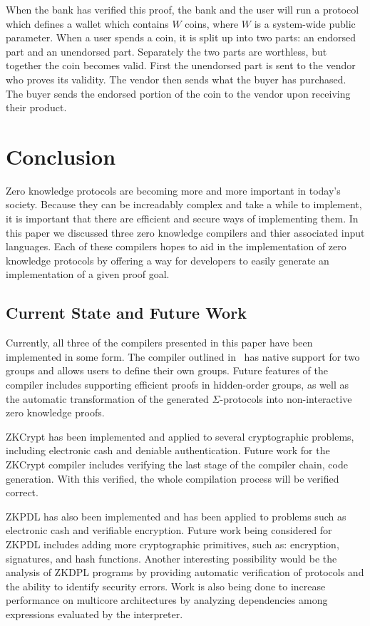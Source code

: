 \documentclass{sig-alternate}
\begin{document}
	When the bank has verified this proof, the bank and the user will run a protocol
	which defines a wallet which contains $W$ coins, where $W$ is a system-wide
	public parameter. When a user spends a coin, it is split up into two parts: an
	endorsed part and an unendorsed part. Separately the two parts are worthless, but
	together the coin becomes valid. First the unendorsed part is sent to the vendor
	who proves its validity. The vendor then sends what the buyer has purchased. The
	buyer sends the endorsed portion of the coin to the vendor upon receiving their
	product.

\section{Conclusion}
	Zero knowledge protocols are becoming more and more important in today's society. 
	Because they can be increadably complex and take a while to implement, it is important 
	that there are efficient and secure ways of implementing them. In this paper we discussed
	three zero knowledge compilers and thier associated input languages. Each of these compilers
	hopes to aid in the implementation of zero knowledge protocols by offering a way for
	developers to easily generate an implementation of a given proof goal.
	
	\subsection{Current State and Future Work}
	Currently, all three of the compilers presented in this paper have
	been implemented in some form. The compiler outlined in~\cite{Sigma:2009}
	has native support for two groups and allows users to define their own
	groups. Future features of the compiler includes supporting efficient
	proofs in hidden-order groups, as well as the automatic transformation
	of the generated $\Sigma$-protocols into non-interactive zero knowledge
	proofs.
	
	ZKCrypt has been implemented and applied to several cryptographic
	problems, including electronic cash and deniable authentication.
	Future work for the ZKCrypt compiler includes verifying the last
	stage of the compiler chain, code generation. With this verified,
	the whole compilation process will be verified correct.
	
	ZKPDL has also been implemented and has been applied to problems
	such as electronic cash and verifiable encryption. Future work being
	considered for ZKPDL includes adding more cryptographic primitives,
	such as: encryption, signatures, and hash functions. Another interesting
	possibility would be the analysis of ZKDPL programs by providing automatic
	verification of protocols and the ability to identify security errors.
	Work is also being done to increase performance on multicore architectures
	by analyzing dependencies among expressions evaluated by the interpreter.	
	
\end{document}
